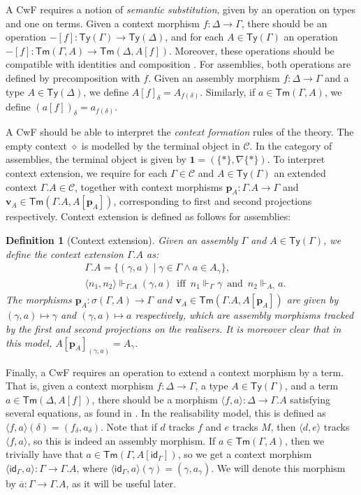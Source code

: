 \documentclass[10pt,a4paper]{article}
\newtheorem{definition}[theorem]{Definition}
\theoremstyle{definition}
\theoremstyle{remark}
\renewcommand{\.}{.\,} %
\renewcommand{\:}{:} %
\newcommand{\C}{\mathcal C}
\newcommand{\id}{\mathsf{id}}
\newcommand{\0}{\mathbf{0}}
\newcommand{\1}{\mathbf{1}}
\newcommand\<\langle
\renewcommand\>\rangle
\newcommand{\Ty}{\mathsf{Ty}}
\newcommand{\Tm}{\mathsf{Tm}}
\newcommand{\p}{\mathbf{p}}
\renewcommand{\v}{\mathbf{v}}
\newcommand{\Iff}{\hspace{6pt}\text{iff}\hspace{6pt}}
\renewcommand{\and}{\hspace{6pt}\text{and}\hspace{6pt}}
\theoremstyle{remark}
\begin{document}
A CwF requires a notion of \emph{semantic substitution}, given by an operation on types and one on terms. Given a context morphism $f :  \Delta \to \Gamma$, there should be an operation $-[f] : \Ty(\Gamma) \to \Ty(\Delta)$, and for each $A \in \Ty(\Gamma)$ an operation $-[f] : \Tm(\Gamma, A) \to \Tm(\Delta, A[f])$. Moreover, these operations should be compatible with identities and composition \cite{Hofmann_1997}. 
For assemblies, both operations are defined by precomposition with $f$. Given an assembly morphism $f :  \Delta \to \Gamma$ and a type $A \in \Ty(\Delta)$, we define $A[f]_\delta = A_{f(\delta)}$. Similarly, if $a \in \Tm(\Gamma, A)$, we define $(a[f])_\delta = a_{f(\delta)}$.

A CwF should be able to interpret the \emph{context formation} rules of the theory. The empty context $\diamond$ is modelled by the terminal object in $\C$. In the category of assemblies, the terminal object is given by $\1 = (\{*\}, \nabla \{*\})$. To interpret context extension, we require for each $\Gamma \in \C$ and $A \in \Ty(\Gamma)$ an extended context $\Gamma.A \in \C$, together with context morphisms $\p_A : \Gamma.A \to \Gamma$ and $\v_A \in \Tm(\Gamma.A, A[\p_A])$, corresponding to first and second projections respectively. Context extension is defined as follows for assemblies:
\begin{definition}[Context extension]
	Given an assembly $\Gamma$ and $A \in \Ty(\Gamma)$, we define the context extension $\Gamma.A$ as:
	\begin{align*}
		& \Gamma.A = \{ (\gamma, a) \mid \gamma \in \Gamma \land a \in A_\gamma\}, \\
		& \langle n_1, n_2 \rangle \Vdash_{\Gamma.A} (\gamma, a) \Iff n_1\Vdash_\Gamma \gamma \and n_2 \Vdash_{A_\gamma} a.
	\end{align*}
	The morphisms $\p_A : \sigma(\Gamma, A) \to \Gamma$ and $\v_A \in \Tm(\Gamma.A, A[\p_A])$ are given by $(\gamma, a) \mapsto \gamma$ and $(\gamma, a) \mapsto a$ respectively, which are assembly morphisms tracked by the first and second projections on the realisers. It is moreover clear that in this model, $A[\p_A]_{(\gamma, a)} = A_\gamma$. 
\end{definition}

Finally, a CwF requires an operation to extend a context morphism by a term. That is, given a context morphism $f : \Delta \to \Gamma$, a type $A \in \Ty(\Gamma)$, and a term $a \in \Tm(\Delta, A[f])$, there should be a morphism $\langle f, a \rangle : \Delta \to \Gamma.A$ satisfying several equations, as found in \cite{Hofmann_1997}. In the realisability model, this is defined as $\langle f, a \rangle (\delta) = (f_\delta, a_\delta)$. Note that if $d$ tracks $f$ and $e$ tracks $M$, then $\langle d, e \rangle$ tracks $\langle f, a \rangle$, so this is indeed an assembly morphism. If $a \in \Tm(\Gamma, A)$, then we trivially have that $a \in \Tm(\Gamma, A[\id_\Gamma])$, so we get a context morphism $\langle \id_\Gamma, a \rangle : \Gamma \to \Gamma . A$, where $\langle \id_\Gamma, a \rangle (\gamma) = (\gamma, a_\gamma)$. We will denote this morphism by $\overline{a} : \Gamma \to \Gamma.A$, as it will be useful later.
\end{document}
